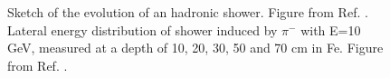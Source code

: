 \begin{figure}[ht]
\centering
{}
\caption{ Sketch of the evolution of an hadronic shower. Figure from Ref. \cite{grupen_shwartz_2008}. 
 Lateral energy distribution of shower induced by $\pi^-$ with E=10 GeV, measured at a depth of 10, 20, 30, 50 and 70 cm in Fe. Figure from Ref. \cite{FRIEND1976505}.}
\label{fig:det:shower_had}
\end{figure}


